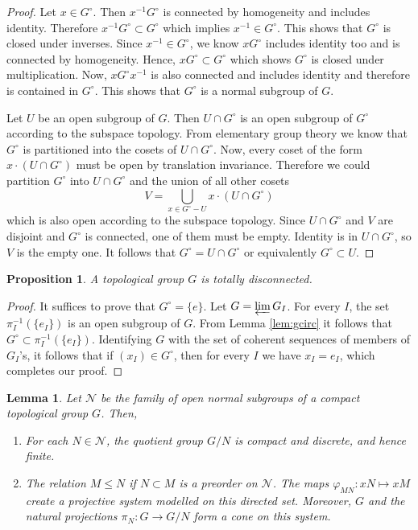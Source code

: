 \documentclass[12pt]{article}
\newtheorem{prop}[thm]{Proposition}
\newtheorem{lem}[thm]{Lemma}
\theoremstyle{definition}
\theoremstyle{remark}
\newcommand*{\nor}{\mathcal{N}}
\newcommand{\gcirc}{G^\circ}
\begin{document}
    \begin{proof}
        Let $x\in\gcirc$. Then $x^{-1}\gcirc$ is connected by homogeneity and includes identity. Therefore $x^{-1}\gcirc\subset\gcirc$ which implies $x^{-1}\in\gcirc$. This shows that $\gcirc$ is closed under inverses. Since $x^{-1}\in\gcirc$, we know $x\gcirc$ includes identity too and is connected by homogeneity. Hence, $x\gcirc\subset\gcirc$ which shows $\gcirc$ is closed under multiplication. Now, $x\gcirc x^{-1}$ is also connected and includes identity and therefore is contained in $\gcirc$. This shows that $\gcirc$ is a normal subgroup of $G$.

        Let $U$ be an open subgroup of $G$. Then $U\cap G^\circ$ is an open subgroup of $G^\circ$ according to the subspace topology. From elementary group theory we know that $\gcirc$ is partitioned into the cosets of $U\cap\gcirc$. Now, every coset of the form $x\cdot (U\cap G^\circ)$ must be open by translation invariance. Therefore we could partition $\gcirc$ into $U\cap\gcirc$ and the union of all other cosets
        $$
        V=\bigcup_{x\in\gcirc-U}x\cdot(U\cap\gcirc)
        $$
        which is also open according to the subspace topology. Since $U\cap\gcirc$ and $V$ are disjoint and $\gcirc$ is connected, one of them must be empty. Identity is in $U\cap\gcirc$, so $V$ is the empty one. It follows that $\gcirc=U\cap\gcirc$ or equivalently $\gcirc\subset U$.
    \end{proof}

    \begin{prop}\label{prop:tod}
        A topological group $G$ is totally disconnected.
    \end{prop}

    \begin{proof}
        It suffices to prove that $G^\circ=\{e\}$. Let $G=\varprojlim G_I$. For every $I$, the set $\pi^{-1}_I(\{e_I\})$ is an open subgroup of $G$. From Lemma \ref{lem:gcirc} it follows that $\gcirc\subset\pi^{-1}_I(\{e_I\})$. Identifying $G$ with the set of coherent sequences of members of $G_I$'s, it follows that if $(x_I)\in \gcirc$, then for every $I$ we have $x_I=e_I$, which completes our proof.
    \end{proof}

    \begin{lem}
        Let $\nor$ be the family of open normal subgroups of a compact topological group $G$. Then,
        \begin{enumerate}[label=(\alph*)]
            \item For each $N\in\nor$, the quotient group $G/N$ is compact and discrete, and hence finite.
            \item The relation $M\leq N$ if $N\subset M$ is a preorder on $\nor$. The maps $\varphi_{MN}\colon xN\mapsto xM$ create a projective system modelled on this directed set. Moreover, $G$ and the natural projections $\pi_N\colon G\to G/N$ form a cone on this system.
        \end{enumerate}
    \end{lem}
\end{document}
